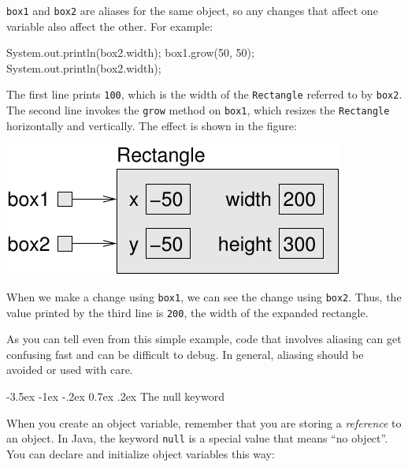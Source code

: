 \documentclass[12pt]{book}
\makeatletter
\theoremstyle{exercise}
\newcommand{\java}[1]{\verb"#1"}
\renewcommand{\section}{\@startsection{section}{1}{\z@}%
    {-3.5ex \@plus -1ex \@minus -.2ex}%
    {0.7ex \@plus.2ex}%
    {\normalfont\Large\bfseries}}
\newcommand{\java}[1]{\lstinline{#1}} %
\makeatother
\begin{document}

\java{box1} and \java{box2} are aliases for the same object,
so any changes that affect one variable also affect the other.
For example:

\begin{code}
    System.out.println(box2.width);
    box1.grow(50, 50);
    System.out.println(box2.width);
\end{code}

The first line prints {\tt 100}, which is the width of the \java{Rectangle} referred to by \java{box2}.
The second line invokes the \java{grow} method on \java{box1}, which resizes the \java{Rectangle} horizontally and vertically.
The effect is shown in the figure:

\begin{center}
\includegraphics{figs/aliasing2.pdf}
\end{center}

When we make a change using \java{box1}, we can see the change using \java{box2}.
Thus, the value printed by the third line is {\tt 200}, the width of the expanded rectangle.

As you can tell even from this simple example, code that involves aliasing can get confusing fast and can be difficult to debug.
In general, aliasing should be avoided or used with care.


\section{The null keyword}


When you create an object variable, remember that you are storing a {\em reference} to an object.
In Java, the keyword \java{null} is a special value that means ``no object''.
You can declare and initialize object variables this way:
\end{document}
